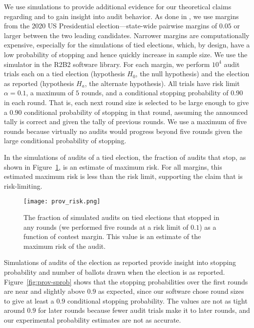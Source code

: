 We use simulations to provide additional evidence for our theoretical claims regarding \Providence and to gain insight into audit behavior. As done in \cite{simulations}, we use margins from the 2020 US Presidential election---state-wide pairwise margins of $0.05$ or larger between the two leading candidates. Narrower margins are computationally expensive, especially for the simulations of tied elections, which, by design, have a low probability of stopping and hence quickly increase in sample size. We use the simulator in the R2B2 software library\cite{r2b2_anon}. For each margin, we perform $10^4$ \Providence audit trials each on a tied election (hypothesis $H_0$, the null hypothesis) and the election as reported (hypothesis $H_a$, the alternate hypothesis). All trials have risk limit $\alpha = 0.1$, a maximum of $5$ rounds, and a conditional stopping probability of $0.90$ in each round. That is, each next round size is selected to be large enough to give a $0.90$ conditional probability of stopping in that round, assuming the announced tally is correct and given the tally of previous rounds. We use a maximum of five rounds because virtually no audits would progress beyond five rounds given the large conditional probability of stopping. 

In the simulations of \Providence audits of a tied election, the fraction of audits that stop, as shown in Figure~\ref{fig:prov-risk}, is an estimate of maximum risk. For all margins, this estimated maximum risk is less than the risk limit, supporting the claim that \Providence is risk-limiting.

\begin{figure}[h!]
\texttt{[image: prov\_risk.png]}
\caption{The fraction of simulated \Providence audits on tied elections that stopped in any rounds (we performed five rounds at a risk limit of $0.1$) as a function of contest margin. This value is an estimate of the maximum risk of the \Providence audit.}
\label{fig:prov-risk}
\end{figure}

Simulations of audits of the election as reported provide insight into stopping probability and number of ballots drawn when the election is as reported. Figure~\ref{fig:prov-sprob} shows that the stopping probabilities over the first rounds are near and slightly above $0.9$ as expected, since our software chose round sizes to give at least a $0.9$ conditional stopping probability. The values are not as tight around $0.9$ for later rounds because fewer audit trials make it to later rounds, and our experimental probability estimates are not as accurate. 

